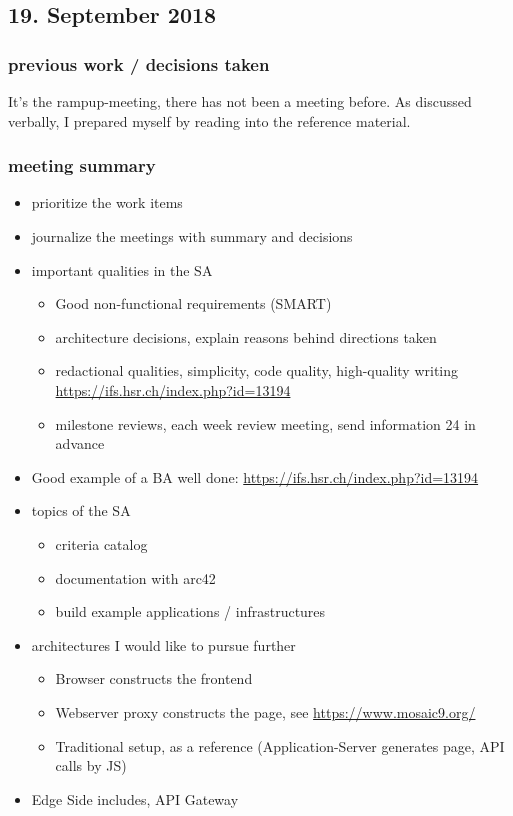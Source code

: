 \documentclass{article}
\begin{document}
\subsection{19. September 2018}

\subsubsection{previous work / decisions taken}
It's the rampup-meeting, there has not been a meeting before. As discussed verbally, I prepared myself by reading into the reference material.

\subsubsection{meeting summary}

\begin{itemize}
    \item prioritize the work items
    \item journalize the meetings with summary and decisions
    \item important qualities in the SA
        \begin{itemize}
            \item Good non-functional requirements (SMART)
            \item architecture decisions, explain reasons behind directions taken
            \item redactional qualities, simplicity, code quality, high-quality writing \url{https://ifs.hsr.ch/index.php?id=13194}
            \item milestone reviews, each week review meeting, send information 24 in advance 
        \end{itemize}
    \item Good example of a BA well done: \url{https://ifs.hsr.ch/index.php?id=13194}
    \item topics of the SA
        \begin{itemize}
            \item criteria catalog
            \item documentation with arc42
            \item build example applications / infrastructures 
        \end{itemize}
    \item architectures I would like to pursue further
        \begin{itemize}
            \item Browser constructs the frontend
            \item Webserver proxy constructs the page, see \url{https://www.mosaic9.org/}
            \item Traditional setup, as a reference (Application-Server generates page, API calls by JS)
        \end{itemize}
    \item Edge Side includes, API Gateway
\end{itemize}
\end{document}
